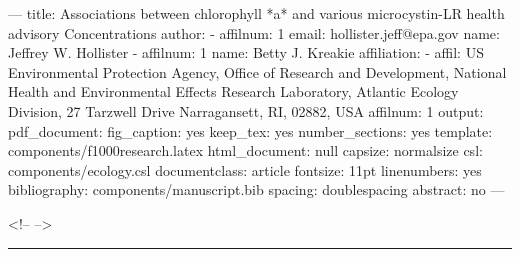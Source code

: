 ---
title: Associations between chlorophyll *a* and various microcystin-LR health advisory
  Concentrations
author:
- affilnum: 1
  email: hollister.jeff@epa.gov
  name: Jeffrey W. Hollister
- affilnum: 1
  name: Betty J. Kreakie
affiliation:
- affil: US Environmental Protection Agency, Office of Research and Development, National
    Health and Environmental Effects Research Laboratory, Atlantic Ecology Division,
    27 Tarzwell Drive  Narragansett, RI, 02882, USA
  affilnum: 1
output:
  pdf_document:
    fig_caption: yes
    keep_tex: yes
    number_sections: yes
    template: components/f1000research.latex
  html_document: null
capsize: normalsize
csl: components/ecology.csl
documentclass: article
fontsize: 11pt
linenumbers: yes
bibliography: components/manuscript.bib
spacing: doublespacing
abstract: no
---

<!--
-->






\singlespace

\vspace{2mm}\hrule

